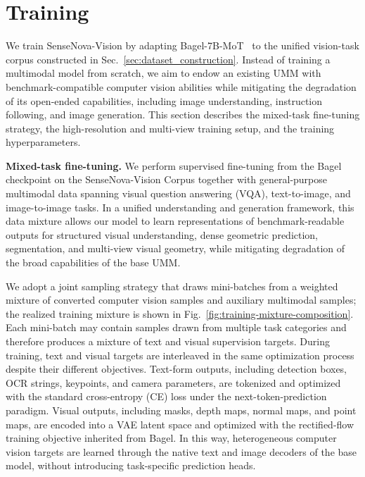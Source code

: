 \section{Training}
\label{sec:training}

We train {SenseNova-Vision} by adapting Bagel-7B-MoT~\cite{bagel} to the unified vision-task corpus constructed in Sec.~\ref{sec:dataset_construction}.
Instead of training a multimodal model from scratch, we aim to endow an existing UMM with benchmark-compatible computer vision abilities while mitigating the degradation of its open-ended capabilities, including image understanding, instruction following, and image generation.
This section describes the mixed-task fine-tuning strategy, the high-resolution and multi-view training setup, and the training hyperparameters.

\textbf{Mixed-task fine-tuning.}
We perform supervised fine-tuning from the Bagel checkpoint on the SenseNova-Vision Corpus together with general-purpose multimodal data spanning visual question answering (VQA), text-to-image, and image-to-image tasks.
In a unified understanding and generation framework, this data mixture allows our model to learn representations of benchmark-readable outputs for structured visual understanding, dense geometric prediction, segmentation, and multi-view visual geometry, while mitigating degradation of the broad capabilities of the base UMM.

We adopt a joint sampling strategy that draws mini-batches from a weighted mixture of converted computer vision samples and auxiliary multimodal samples; the realized training mixture is shown in Fig.~\ref{fig:training-mixture-composition}.
Each mini-batch may contain samples drawn from multiple task categories and therefore produces a mixture of text and visual supervision targets.
During training, text and visual targets are interleaved in the same optimization process despite their different objectives.
Text-form outputs, including detection boxes, OCR strings, keypoints, and camera parameters, are tokenized and optimized with the standard cross-entropy (CE) loss under the next-token-prediction paradigm.
Visual outputs, including masks, depth maps, normal maps, and point maps, are encoded into a VAE latent space and optimized with the rectified-flow training objective inherited from Bagel.
In this way, heterogeneous computer vision targets are learned through the native text and image decoders of the base model, without introducing task-specific prediction heads.

